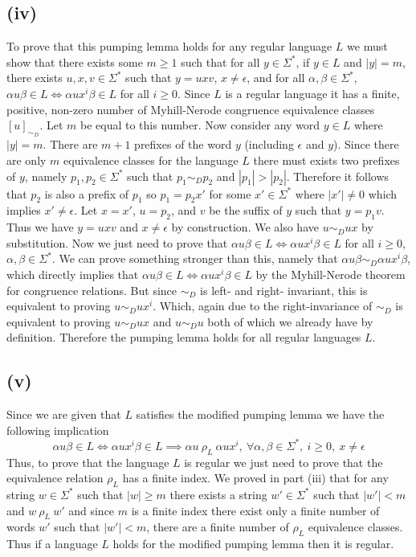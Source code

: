 \documentclass[12pt]{article}
\begin{document}
\subsection*{(iv)}
To prove that this pumping lemma holds for any regular language $L$ we must show
that there exists some $m \ge 1$ such that for all $y \in \Sigma^*$,
if $y \in L$ and $|y| = m$, there exists $u,x,v \in \Sigma^*$ such that
$y = uxv$, $x \neq \epsilon$, and for all $\alpha, \beta \in \Sigma^*$,
$\alpha u\beta \in L \iff \alpha ux^i\beta \in L$ for all $i \ge 0$.
Since $L$ is a regular language it has a finite, positive, non-zero number of
Myhill-Nerode congruence equivalence classes $[u]_{\sim_D}$.
Let $m$ be equal to this number. Now consider any word $y \in L$ where $|y| = m$.
There are $m+1$ prefixes of the word $y$ (including $\epsilon$ and $y$). Since
there are only $m$ equivalence classes for the language $L$ there must exists
two prefixes of $y$, namely $p_1,p_2 \in \Sigma^*$ such that $p_1 \sim_D p_2$
and $|p_1| > |p_2|$. Therefore it follows that $p_2$ is also a prefix of $p_1$
so $p_1 = p_2x'$ for some $x' \in \Sigma^*$ where $|x'| \neq 0$ which implies
$x' \neq \epsilon$. Let $x=x'$, $u=p_2$, and $v$ be the suffix of $y$
such that $y=p_1v$. Thus we have $y = uxv$ and $x \neq \epsilon$ by construction.
We also have $u \sim_D ux$ by substitution. Now we just need to prove that
$\alpha u\beta \in L \iff \alpha ux^i\beta \in L$ for all $i \ge 0$,
$\alpha,\beta \in \Sigma^*$. We can prove something stronger than this,
namely that $\alpha u\beta \sim_D \alpha ux^i\beta$, which directly implies that
$\alpha u\beta \in L \iff \alpha ux^i\beta \in L$ by the
Myhill-Nerode theorem for congruence relations. But since $\sim_D$ is left- and
right- invariant, this is equivalent to proving $u \sim_D ux^i$. Which, again
due to the right-invariance of $\sim_D$ is equivalent to proving $u \sim_D ux$
and $u \sim_D u$ both of which we already have by definition.
Therefore the pumping lemma holds for all regular languages $L$.

\subsection*{(v)}
Since we are given that $L$ satisfies the modified pumping lemma we have the
following implication
$$\alpha u\beta \in L \iff \alpha ux^i\beta \in L
\implies \alpha u\ \rho_L\ \alpha ux^i,
\ \forall \alpha,\beta \in \Sigma^*,\ i \ge 0,\ x \neq \epsilon$$
Thus, to prove that the language $L$ is regular we just need to prove that the
equivalence relation $\rho_L$ has a finite index.
We proved in part (iii) that for any string $w \in \Sigma^*$ such that
$|w| \ge m$ there exists a string $w' \in \Sigma^*$ such that $|w'| < m$ and
$w\ \rho_L\ w'$ and since $m$ is a finite index there exist only a finite
number of words $w'$ such that $|w'| < m$, there are a finite number of $\rho_L$
equivalence classes. Thus if a language $L$ holds for the modified pumping
lemma then it is regular.
\end{document}
